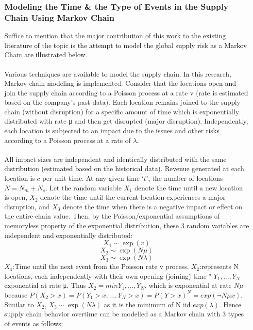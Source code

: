 \documentclass[conference]{IEEEtran}
\begin{document}
\subsubsection{Modeling the Time \& the Type of Events in the Supply Chain Using Markov Chain}
Suffice to mention that the major contribution of this work to the existing literature of the topic is the attempt to model the global supply risk as a Markov Chain are illustrated below.\\\\ Various techniques are available to model the supply chain. In this research, Markov chain modeling is implemented. Consider that the locations open and join the supply chain according to a Poisson process at a rate v (rate is estimated based on the company’s past data). Each location remains joined to the supply chain (without disruption) for a specific amount of time which is exponentially distributed with rate μ and then get disrupted (major disruption). Independently, each location is subjected to an impact due to the issues and other risks according to a Poisson process at a rate of $\lambda$.\\\\ All impact sizes are independent and identically distributed with the same distribution (estimated based on the historical data). Revenue generated at each location is $c$ per unit time. At any given time $‘t’$, the number of locations $N =N_m+N_s$. Let the random variable $X_1$ denote the time until a new location is open, $X_2$ denote the time until the current location experiences a major disruption, and $X_3$ denote the time when there is a negative impact or effect on the entire chain value. Then, by the Poisson/exponential assumptions of memoryless property of the exponential distribution, these 3 random variables are independent and exponentially distributed:\newline
$$
X_1 \sim \operatorname{exp}\left({v}\right)
$$
$$
X_2 \sim \operatorname{exp}\left({N \mu}\right)
$$
$$
X_3 \sim \operatorname{exp}\left({N \lambda}\right)
$$
$X_1$:Time until the next event from the Poisson rate v process.
$X_2$:represents N locations, each independently with their own opening (joining) time " $Y_1,...,Y_N$ exponential at rate μ. Thus $X_2 = min {Y_1,...,Y_N}$, which is exponential at rate $N\mu$ because $P(X_2>x)=P(Y_1>x,...,Y_N>x) = P(Y>x)^N=exp(\neg N\mu x).$
Similar to $X_2$, $X_3 \sim \operatorname{exp}\left({N \lambda}\right)$ as it is the minimum of N iid $exp(\lambda)$. Hence supply chain behavior overtime can be modelled as a Markov chain with 3 types of events as follows:\newline
\end{document}
